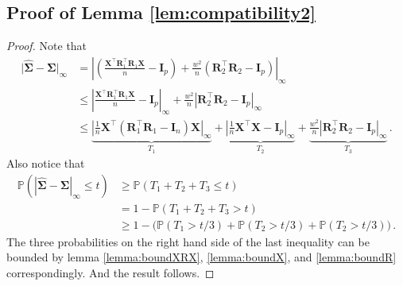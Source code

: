 \documentclass[11pt]{article}
\renewcommand{\hat}{\widehat}
\newcommand{\bX}{\boldsymbol{X}}
\newcommand{\bI}{\boldsymbol{I}}
\newcommand{\bR}{\boldsymbol{R}}
\newcommand{\bSigma}{\boldsymbol{\Sigma}}
\newcommand{\Prob}{\mathbb{P}}
\begin{document}
\subsection{Proof of Lemma \ref{lem:compatibility2}}\label{pf:compatibility2}
\begin{proof}
    Note that 
    \begin{align*}
        \big|\hat{\bSigma}-\bSigma\big|_\infty &=  \left|\left( \frac{\bX^\top \bR_1^\top \bR_1 \bX}{n}-\bI_p\right)+\frac{w^2}{n}(\bR_2^\top \bR_2-\bI_p)\right|_\infty\\
            &\le \left|\frac{\bX^\top \bR_1^\top \bR_1 \bX}{n}-\bI_p\right|_\infty +\frac{w^2}{n}|\bR_2^\top \bR_2-\bI_p|_\infty\\
            &\leq \underbrace{\left|\frac{1}{n}\bX^\top (\bR_1^\top \bR_1-\bI_n)\bX\right|_\infty}_{T_1}+\underbrace{\left|\frac{1}{n}\bX^\top \bX-\bI_p\right|_\infty}_{T_2}+\underbrace{\frac{w^2}{n}|\bR_2^\top \bR_2-\bI_p|_\infty}_{T_3}\,.
    \end{align*}
    Also notice that 
    \begin{align*}
        \Prob\left(\left|\hat{\bSigma}-\bSigma\right|_\infty\leq t\right)&\geq \Prob(T_1+T_2+T_3\leq t)\\
            &=  1- \Prob(T_1+T_2+T_3>t)\\
            &\geq 1- \bigg(\Prob(T_1>t/3) + \Prob(T_2>t/3)+\Prob(T_2>t/3)\bigg)\,.
    \end{align*}
    The three probabilities on the right hand side of the last inequality can be bounded by lemma \ref{lemma:boundXRX}, \ref{lemma:boundX}, and \ref{lemma:boundR} correspondingly. And the result follows.
\end{proof}
\end{document}
